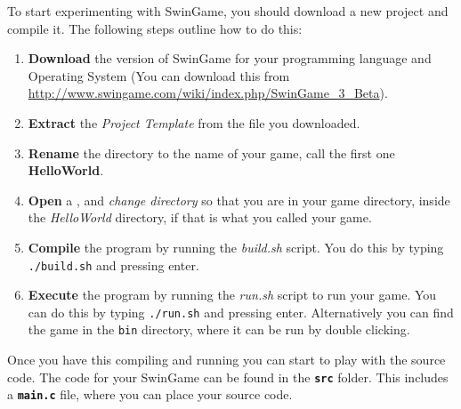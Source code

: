 To start experimenting with SwinGame, you should download a new project and compile it. The following steps outline how to do this:
\begin{enumerate}
  \item \textbf{Download} the version of SwinGame for your programming language and Operating System (You can download this from \url{http://www.swingame.com/wiki/index.php/SwinGame_3_Beta}). 
  \item \textbf{Extract} the \emph{Project Template} from the file you downloaded.
  \item \textbf{Rename} the directory to the name of your game, call the first one \textbf{HelloWorld}.
  \item \textbf{Open} a , and \emph{change directory} so that you are in your game directory, inside the \emph{HelloWorld} directory, if that is what you called your game.
  \item \textbf{Compile} the program by running the \emph{build.sh} script. You do this by typing \texttt{./build.sh} and pressing enter.
  \item \textbf{Execute} the program by running the \emph{run.sh} script to run your game. You can do this by typing \texttt{./run.sh} and pressing enter. Alternatively you can find the game in the \texttt{bin} directory, where it can be run by double clicking.
\end{enumerate}

Once you have this compiling and running you can start to play with the source code. The code for your SwinGame can be found in the \textbf{\texttt{src}} folder. This includes a \texttt{\textbf{main.c}} file, where you can place your source code.



